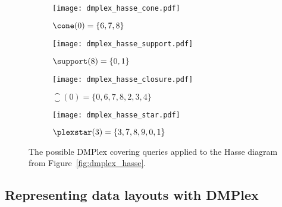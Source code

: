 \documentclass[thesis]{subfiles}
\begin{document}
\begin{figure}
  \centering
  \begin{subfigure}{.49\textwidth}
    \centering
    \texttt{[image: dmplex\_hasse\_cone.pdf]}
    \caption{$\cone(0) = \{6,7,8\}$}
  \end{subfigure}
  \begin{subfigure}{.49\textwidth}
    \centering
    \texttt{[image: dmplex\_hasse\_support.pdf]}
    \caption{$\support(8) = \{0,1\}$}
  \end{subfigure}

  \begin{subfigure}{.49\textwidth}
    \centering
    \texttt{[image: dmplex\_hasse\_closure.pdf]}
    \caption{$\closure(0) = \{0,6,7,8,2,3,4\}$}
  \end{subfigure}
  \begin{subfigure}{.49\textwidth}
    \centering
    \texttt{[image: dmplex\_hasse\_star.pdf]}
    \caption{$\plexstar(3) = \{3,7,8,9,0,1\}$}
  \end{subfigure}

  \caption{
    The possible DMPlex covering queries applied to the Hasse diagram from Figure~\ref{fig:dmplex_hasse}.
  }
  \label{fig:dmplex_queries}
\end{figure}


\subsection{Representing data layouts with DMPlex}
\end{document}
